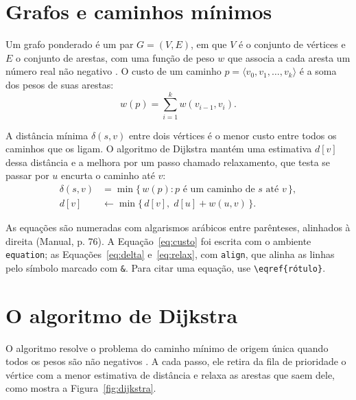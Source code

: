 \documentclass[tcc,capa]{texufpel}
\begin{document}
\section{Grafos e caminhos mínimos}
\label{sec:grafos}

Um grafo ponderado é um par $G = (V, E)$, em que $V$ é o conjunto de vértices
e $E$ o conjunto de arestas, com uma função de peso $w$ que associa a cada
aresta um número real não negativo \citep{Cormen:2022:IA}. O custo de um
caminho $p = \langle v_0, v_1, \dots, v_k \rangle$ é a soma dos pesos de suas
arestas:
\begin{equation}
  w(p) = \sum_{i=1}^{k} w(v_{i-1}, v_i).
  \label{eq:custo}
\end{equation}

A distância mínima $\delta(s, v)$ entre dois vértices é o menor custo entre
todos os caminhos que os ligam. O algoritmo de Dijkstra mantém uma estimativa
$d[v]$ dessa distância e a melhora por um passo chamado relaxamento, que
testa se passar por $u$ encurta o caminho até $v$:
\begin{align}
  \delta(s, v) &= \min \{\, w(p) : p \text{ é um caminho de } s \text{ até } v \,\},
  \label{eq:delta}\\
  d[v] &\leftarrow \min \{\, d[v],\; d[u] + w(u, v) \,\}.
  \label{eq:relax}
\end{align}

As equações são numeradas com algarismos arábicos entre parênteses, alinhados
à direita (Manual, p. 76). A Equação~\eqref{eq:custo} foi escrita com o
ambiente \texttt{equation}; as Equações~\eqref{eq:delta} e~\eqref{eq:relax},
com \texttt{align}, que alinha as linhas pelo símbolo marcado com \verb|&|.
Para citar uma equação, use \verb|\eqref{rótulo}|.

\section{O algoritmo de Dijkstra}
\label{sec:dijkstra}

O algoritmo resolve o problema do caminho mínimo de origem única quando todos
os pesos são não negativos \citep{Dijkstra:1959:NTP}. A cada passo, ele retira
da fila de prioridade o vértice com a menor estimativa de distância e relaxa
as arestas que saem dele, como mostra a Figura~\ref{fig:dijkstra}.
\end{document}
